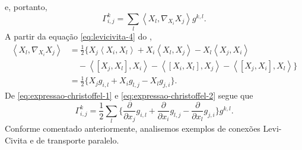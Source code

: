e, portanto,
\begin{equation}
	\label{eq:expressao-christoffel-1}
	\Gamma_{i,j}^{k}=\sum_{l}\left<X_{l},\nabla_{X_{i}}X_{j}\right>g^{k,l}.
\end{equation}
A partir da equação \eqref{eq:levicivita-4} do ,
\begin{align}
	\left<X_l,\nabla_{X_i}X_j\right> & = \frac{1}{2} \Big\{ X_j\left<X_i,X_l\right> + X_i\left<X_l,X_j\right> - X_l\left<X_j,X_i\right>   \nonumber  \\
	                                 & \quad - \left<[X_j,X_l],X_i\right> - \left<[X_i,X_l],X_j\right> - \left<[X_j,X_i],X_l\right> \Big\} \nonumber \\
	                                 & =\frac{1}{2}\Big\{X_{j}g_{i,l}+X_{i}g_{l,j}-X_{l}g_{j,i}\Big\}. \label{eq:expressao-christoffel-2}
\end{align}
De \eqref{eq:expressao-christoffel-1} e \eqref{eq:expressao-christoffel-2} segue que
\begin{equation}
	\label{eq:christoffel}
	\Gamma_{i,j}^{k}=\frac{1}{2}\sum_{l}\Big\{\frac{\partial}{\partial x_{j}}g_{i,l}+\frac{\partial}{\partial x_{i}}g_{l,j}-\frac{\partial}{\partial x_{l}}g_{j,i}\Big\}g^{k,l}.
\end{equation}
Conforme comentado anteriormente, analisemos exemplos de conexões Levi-Civita e de transporte paralelo.
